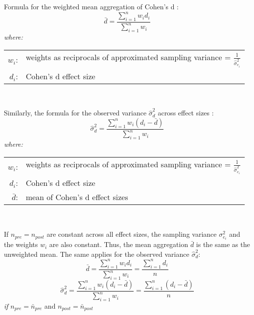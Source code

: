 \par Formula for the weighted mean aggregation of Cohen's d \parencite{borenstein2021introduction, hedges1985statistical, morris2002combining}:
\begin{equation} \label{eq:mean_weighted}
    \bar{d} = \frac{\sum_{i=1}^{n} w_{i} d_{i}}{\sum_{i=1}^{n} w_{i}}
\end{equation}
\hspace{0.5cm} \textit{where:} \\
\hspace*{3em}
\begin{tabular}{rl}
    $w_{i}$:& weights as reciprocals of approximated sampling variance = $\frac{1}{\hat{\sigma}^2_{e_{i}}}$ \\
    $d_{i}$:& Cohen's d effect size \\
\end{tabular} \\

\par Similarly, the formula for the observed variance $\hat{\sigma}^2_{d}$ across effect sizes \parencite{morris2002combining}:
\begin{equation} \label{eq:variance_observed}
    \hat{\sigma}^2_{d} = \frac{\sum_{i=1}^{n} w_{i} (d_{i}-\bar{d})}{\sum_{i=1}^{n} w_{i}}
\end{equation}
\hspace{0.5cm} \textit{where:} \\
\hspace*{3em}
\begin{tabular}{rl}
    $w_{i}$:& weights as reciprocals of approximated sampling variance = $\frac{1}{\hat{\sigma}^2_{e_{i}}}$ \\
    $d_{i}$:& Cohen's d effect size \\
    $\bar{d}$:& mean of Cohen's d effect sizes \\
\end{tabular} \\

\newpage
\par If $n_{pre} = n_{post}$ are constant across all effect sizes, the sampling variance $\sigma^2_{e_{i}}$ and the weights $w_{i}$ are also constant. Thus, the mean aggregation $\bar{d}$ is the same as the unweighted mean. The same applies for the observed variance $\hat{\sigma}^2_{d}$:
\begin{equation} \label{eq:mean_unweighted}
    \bar{d} = \frac{\sum_{i=1}^{n} w_{i} d_{i}}{\sum_{i=1}^{n} w_{i}} = \frac{\sum_{i=1}^{n} d_{i}}{n}
\end{equation}
\begin{equation} \label{eq:variance_observed_unweighted}
    \hat{\sigma}^2_{d} = \frac{\sum_{i=1}^{n} w_{i} (d_{i}-\bar{d})}{\sum_{i=1}^{n} w_{i}} = \frac{\sum_{i=1}^{n} (d_{i}-\bar{d})}{n}
\end{equation}
\hspace{0.5cm} \textit{if} $n_{pre} = \bar{n}_{pre}$ and $n_{post} = \bar{n}_{post}$